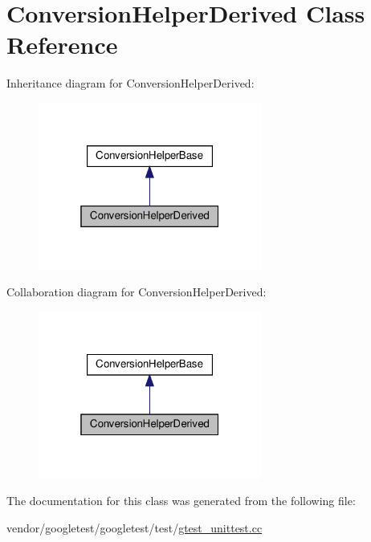 \hypertarget{class_conversion_helper_derived}{}\section{Conversion\+Helper\+Derived Class Reference}
\label{class_conversion_helper_derived}


Inheritance diagram for Conversion\+Helper\+Derived\+:
\nopagebreak
\begin{figure}[H]
\begin{center}
\leavevmode
\includegraphics[width=208pt]{class_conversion_helper_derived__inherit__graph}
\end{center}
\end{figure}


Collaboration diagram for Conversion\+Helper\+Derived\+:
\nopagebreak
\begin{figure}[H]
\begin{center}
\leavevmode
\includegraphics[width=208pt]{class_conversion_helper_derived__coll__graph}
\end{center}
\end{figure}


The documentation for this class was generated from the following file\+:\begin{DoxyCompactItemize}
\item 
vendor/googletest/googletest/test/\hyperlink{gtest__unittest_8cc}{gtest\+\_\+unittest.\+cc}\end{DoxyCompactItemize}
